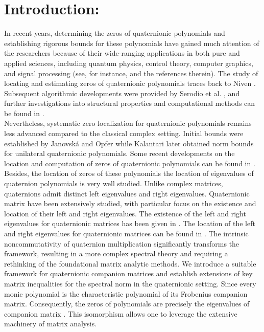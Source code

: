 \documentclass [12pt]{article}
\begin{document}
\section{Introduction:} In recent years, determining the zeros of quaternionic polynomials and establishing rigorous bounds for these polynomials have gained much attention of the researchers because of their wide-ranging applications in both pure and applied sciences, including quantum physics, control theory, computer graphics, and signal processing (see, for instance, \cite{ASL,ASS,CJH,HTL} and the references therein). The study of locating and estimating zeros of quaternionic polynomials traces back to Niven \cite{IN}. Subsequent algorithmic developments were provided by Serodio et al. \cite{SR}, and further investigations into structural properties and computational methods can be found in \cite{GM,JD,O,PS}.\\ \indent Nevertheless, systematic zero localization for quaternionic polynomials remains less advanced compared to the classical complex setting. Initial bounds were established by Janovská and  Opfer \cite{JD,O} while Kalantari \cite{BK} later obtained norm bounds for unilateral quaternionic polynomials. Some recent developments on the location and computation of zeros of quaternionic polynomials can be found in  \cite{ASS,JO,IQ}. Besides, the location of zeros of these polynomials the location of eigenvalues of quaternion polynomials is very well studied. Unlike complex matrices, quaternions admit distinct left eigenvalues and right eigenvalues. Quaternionic matrix have been extensively studied, with particular focus on the existence and location of their left and right eigenvalues. The existence of the left and right eigenvalues for quaternionic matrices has been given in  \cite{BA,BJL,WRM}. The location of the left and right eigenvalues for quaternionic matrices can be found in  \cite{ASL,BA,CJH,ABG,HTL,JQ,BK,PR,RL,WRL, ZF1,ZF2}.  
The intrinsic noncommutativity of quaternion multiplication significantly transforms the framework, resulting in a more complex spectral theory and requiring a rethinking of the foundational matrix analytic methods. We introduce a suitable framework for quaternionic companion matrices and establish extensions of key matrix inequalities for the spectral norm in the quaternionic setting. Since every monic polynomial is the characteristic polynomial of its Frobenius companion matrix. Consequently, the zeros of polynomials are precisely the eigenvalues of companion matrix . This isomorphism allows one to leverage the extensive machinery of matrix analysis. 
\end{document}
